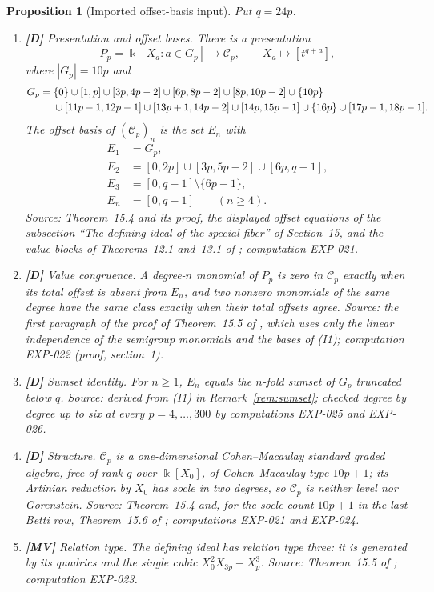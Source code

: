 \documentclass[11pt]{article}
\newtheorem{proposition}[theorem]{Proposition}
\theoremstyle{definition}
\theoremstyle{remark}
\newcommand{\kfield}{\Bbbk}
\newcommand{\Cfiber}{\mathcal{C}}
\newcommand{\mD}{\textbf{[D]}}
\newcommand{\mMV}{\textbf{[MV]}}
\begin{document}
\begin{proposition}[Imported offset-basis input]\label{prop:input}
Put $q=24p$.
\begin{enumerate}
\item[\textup{(I1)}] \mD{} \emph{Presentation and offset bases.} There is a presentation
\[
 P_p=\kfield[X_a:a\in G_p]\longrightarrow\Cfiber_p,
 \qquad X_a\longmapsto[t^{q+a}],
\]
where $|G_p|=10p$ and
\begin{align}
G_p={}&\{0\}\cup[1,p]\cup[3p,4p-2]\cup[6p,8p-2]\cup[8p,10p-2]
\cup\{10p\}\notag\\
&\cup[11p-1,12p-1]\cup[13p+1,14p-2]\cup[14p,15p-1]
\cup\{16p\}\cup[17p-1,18p-1].\label{eq:generators}
\end{align}
The offset basis of $(\Cfiber_p)_n$ is the set $E_n$ with
\begin{align}
E_1&=G_p,\\
E_2&=[0,2p]\cup[3p,5p-2]\cup[6p,q-1],\\
E_3&=[0,q-1]\setminus\{6p-1\},\\
E_n&=[0,q-1]\qquad(n\geq4).\label{eq:bases}
\end{align}
Source: Theorem~15.4 and its proof, the displayed offset equations of the subsection ``The
defining ideal of the special fiber'' of Section~15, and the value blocks of Theorems~12.1 and~13.1
of \cite{SantibanezLeal2026}; computation EXP-021.
\item[\textup{(I2)}] \mD{} \emph{Value congruence.} A degree-$n$ monomial of $P_p$ is zero in
$\Cfiber_p$ exactly when its total offset is absent from $E_n$, and two nonzero monomials of
the same degree have the same class exactly when their total offsets agree. Source: the first
paragraph of the proof of Theorem~15.5 of \cite{SantibanezLeal2026}, which uses only the linear
independence of the semigroup monomials and the bases of (I1); computation EXP-022
(proof, section~1).
\item[\textup{(I3)}] \mD{} \emph{Sumset identity.} For $n\geq1$, $E_n$ equals the $n$-fold
sumset of $G_p$ truncated below $q$. Source: derived from (I1) in
Remark~\ref{rem:sumset}; checked degree by degree up to six at every $p=4,\ldots,300$ by
computations EXP-025 and EXP-026.
\item[\textup{(I4)}] \mD{} \emph{Structure.} $\Cfiber_p$ is a one-dimensional Cohen--Macaulay
standard graded algebra, free of rank $q$ over $\kfield[X_0]$, of Cohen--Macaulay type $10p+1$;
its Artinian reduction by $X_0$ has socle in two degrees, so $\Cfiber_p$ is neither level nor
Gorenstein. Source: Theorem~15.4 and, for the socle count $10p+1$ in the last Betti row,
Theorem~15.6 of \cite{SantibanezLeal2026}; computations EXP-021 and EXP-024.
\item[\textup{(I5)}] \mMV{} \emph{Relation type.} The defining ideal has relation type three:
it is generated by its quadrics and the single cubic $X_0^2X_{3p}-X_p^3$. Source: Theorem~15.5 of
\cite{SantibanezLeal2026}; computation EXP-023.
\end{enumerate}
\end{proposition}
\end{document}
